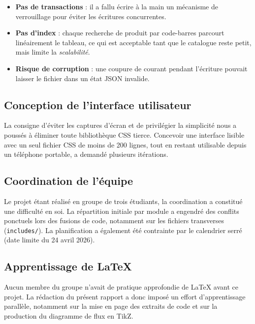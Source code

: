 \documentclass[12pt,a4paper]{article}
\begin{document}
\begin{itemize}[leftmargin=1.5em]
    \item \textbf{Pas de transactions} : il a fallu écrire à la main un mécanisme de verrouillage pour éviter les écritures concurrentes.
    \item \textbf{Pas d'index} : chaque recherche de produit par code-barres parcourt linéairement le tableau, ce qui est acceptable tant que le catalogue reste petit, mais limite la \textit{scalabilité}.
    \item \textbf{Risque de corruption} : une coupure de courant pendant l'écriture pouvait laisser le fichier dans un état JSON invalide.
\end{itemize}

\subsection{Conception de l'interface utilisateur}

La consigne d'éviter les captures d'écran et de privilégier la simplicité nous a poussés à éliminer toute bibliothèque CSS tierce. Concevoir une interface lisible avec un seul fichier CSS de moins de 200 lignes, tout en restant utilisable depuis un téléphone portable, a demandé plusieurs itérations.

\subsection{Coordination de l'équipe}

Le projet étant réalisé en groupe de trois étudiants, la coordination a constitué une difficulté en soi. La répartition initiale par module a engendré des conflits ponctuels lors des fusions de code, notamment sur les fichiers transverses (\texttt{includes/}). La planification a également été contrainte par le calendrier serré (date limite du 24 avril 2026).

\subsection{Apprentissage de \LaTeX{}}

Aucun membre du groupe n'avait de pratique approfondie de \LaTeX{} avant ce projet. La rédaction du présent rapport a donc imposé un effort d'apprentissage parallèle, notamment sur la mise en page des extraits de code et sur la production du diagramme de flux en TikZ.

\end{document}

